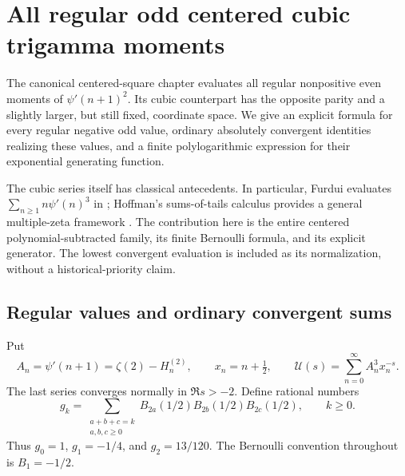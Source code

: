 
\section{All regular odd centered cubic trigamma moments}
\label{cc:sec}

The canonical centered-square chapter evaluates all regular nonpositive
even moments of $\psi'(n+1)^2$.  Its cubic counterpart has the opposite
parity and a slightly larger, but still fixed, coordinate space.  We give
an explicit formula for every regular negative odd value, ordinary
absolutely convergent identities realizing these values, and a finite
polylogarithmic expression for their exponential generating function.

The cubic series itself has classical antecedents.  In particular,
Furdui evaluates $\sum_{n\ge1}n\psi'(n)^3$ in
\cite[Theorem 1(b)]{cc:furdui2015}; Hoffman's sums-of-tails calculus
provides a general multiple-zeta framework \cite{cc:hoffman2016}.
The contribution here is the entire centered polynomial-subtracted
family, its finite Bernoulli formula, and its explicit generator.
The lowest convergent evaluation is included as its normalization,
without a historical-priority claim.

\subsection{Regular values and ordinary convergent sums}

Put
\begin{equation}\label{cc:definitions}
 A_n=\psi'(n+1)=\zeta(2)-H_n^{(2)},\qquad
 x_n=n+\tfrac12,\qquad
 \mathcal U(s)=\sum_{n=0}^{\infty}A_n^3x_n^{-s}.
\end{equation}
The last series converges normally in $\Re s>-2$.  Define rational
numbers
\begin{equation}\label{cc:g}
 g_k=\sum_{\substack{a+b+c=k\\a,b,c\ge0}}
 B_{2a}(1/2)B_{2b}(1/2)B_{2c}(1/2),\qquad k\ge0.
\end{equation}
Thus $g_0=1$, $g_1=-1/4$, and $g_2=13/120$.
The Bernoulli convention throughout is $B_1=-1/2$.

